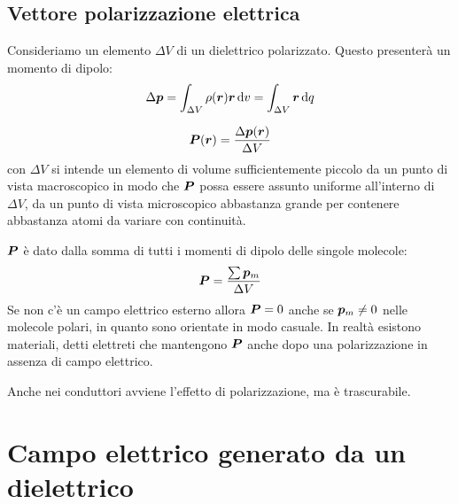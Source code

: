 \subsection{Vettore polarizzazione elettrica}
Consideriamo un elemento $\Delta V$ di un dielettrico polarizzato. Questo presenterà un momento di dipolo:
\[
  \Delta\boldsymbol{p}=\int_{\Delta V}\rho(\boldsymbol{r})\boldsymbol{r}\,\mathrm{d} v=\int_{\Delta V}\boldsymbol{r}\,\mathrm{d} q
\]
\begin{Def}
  \begin{equation}
    \boldsymbol{P}(\boldsymbol{r})=\frac{\Delta\boldsymbol{p}(\boldsymbol{r})}{\Delta V}
    \label{vettore_polarizzazione_elettrica}
  \end{equation}
  con $\Delta V$ si intende un elemento di volume sufficientemente piccolo da un punto di vista macroscopico in modo che $\boldsymbol{P}$ possa essere assunto uniforme all'interno di $\Delta V$, da un punto di vista microscopico abbastanza grande per contenere abbastanza atomi da variare con continuità.
\end{Def}
$\boldsymbol{P}$ è dato dalla somma di tutti i momenti di dipolo delle singole molecole:
\begin{equation}
  \boldsymbol{P}=\frac{\sum\boldsymbol{p}_m}{\Delta V}
\end{equation}
Se non c'è un campo elettrico esterno allora $\boldsymbol{P}=0$ anche se $\boldsymbol{p}_m\neq 0$ nelle molecole polari, in quanto sono orientate in modo casuale. In realtà esistono materiali, detti elettreti che mantengono $\boldsymbol{P}$ anche dopo una polarizzazione in assenza di campo elettrico.

Anche nei conduttori avviene l'effetto di polarizzazione, ma è trascurabile.

\section{Campo elettrico generato da un dielettrico}
\label{section:Campo_elettrico_generato_da_un_dielettrico}
